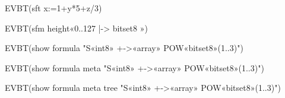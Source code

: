 \documentclass[10pt,a4paper]{article}
\begin{document}
EVBT(sft x:=1+y*5+z/3)

EVBT(sfm height«0..127 |-> bitset8 »)

EVBT(show formula "S«int8» +->«array» POW«bitset8»(1..3)")

EVBT(show formula meta "S«int8» +->«array» POW«bitset8»(1..3)")

EVBT(show formula meta tree "S«int8» +->«array» POW«bitset8»(1..3)")
\end{document}
